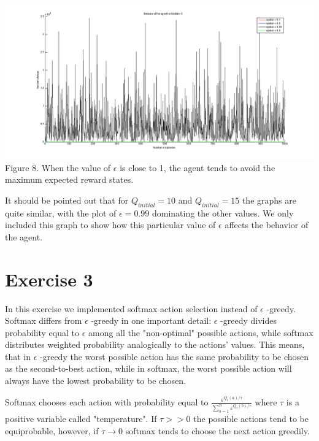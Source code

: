 \documentclass[a4paper,11pt]{article}
\begin{document}
\begin{center}

\includegraphics[width=1.0\textwidth,height=0.4\textheight]{epsilonsQ5.png}
\label{Figure 1}
Figure 8. When the value of $\epsilon$ is close to 1, the agent tends to avoid the maximum expected reward states. \vspace{1cm}
\end{center}

\newpage
It should be pointed out that for $Q_{initial} = 10$ and $Q_{initial} = 15$ the graphs are quite similar, with the plot of $\epsilon = 0.99$ dominating the other values. We only included this graph to show how this particular value of $\epsilon$ affects the behavior of the agent.
\section*{Exercise 3}

In this exercise we implemented softmax action selection instead of $\epsilon$ -greedy. 
Softmax differs from $\epsilon$ -greedy in one important detail: $\epsilon$ -greedy divides probability equal to $\epsilon$ among all the "non-optimal" possible actions, while softmax distributes weighted probability analogically to the actions' values. This means, that in $\epsilon$ -greedy the worst possible action has the same probability to be chosen as the second-to-best action, while in softmax, the worst possible action will always have the lowest probability to be chosen.

Softmax chooses each action with probability equal to $\frac{\varepsilon ^{Q_t(a)/ \tau}}{\sum^n_{b=1}\varepsilon ^{Q_t(b)/ \tau}}$
where $\tau$ is a positive variable called "temperature". If $\tau >> 0$ the possible actions tend to be equiprobable, however, if $\tau \rightarrow 0$ softmax tends to choose the next action greedily.
\end{document}
